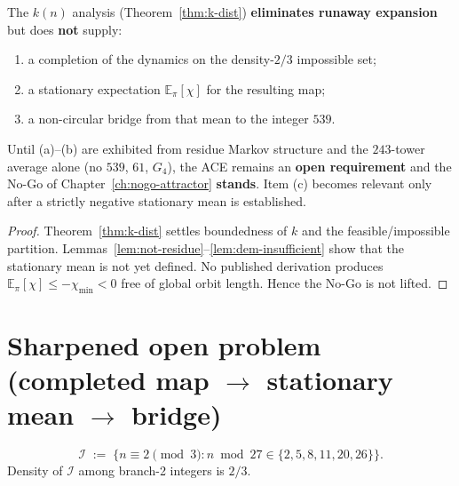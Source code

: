 \begin{theorem}
\label{thm:no-ACE-yet}
The \(k(n)\) analysis (Theorem~\ref{thm:k-dist}) \textbf{eliminates runaway
expansion} but does \textbf{not} supply:
\begin{enumerate}[label=(\alph*)]
  \item a completion of the dynamics on the density-\(2/3\) impossible set;
  \item a stationary expectation \(\mathbb{E}_\pi[\chi]\) for the resulting map;
  \item a non-circular bridge from that mean to the integer \(539\).
\end{enumerate}
Until (a)--(b) are exhibited from residue Markov structure and the
\(243\)-tower average alone (no \(539\), \(61\), \(G_4\)), the ACE remains an
\textbf{open requirement} and the No-Go of Chapter~\ref{ch:nogo-attractor}
\textbf{stands}. Item (c) becomes relevant only after a strictly negative
stationary mean is established.
\end{theorem}

\begin{proof}
Theorem~\ref{thm:k-dist} settles boundedness of \(k\) and the feasible/impossible
partition. Lemmas~\ref{lem:not-residue}--\ref{lem:dem-insufficient} show that
the stationary mean is not yet defined. No published derivation produces
\(\mathbb{E}_\pi[\chi]\le -\chi_{\min}<0\) free of global orbit length. Hence the
No-Go is not lifted.
\end{proof}

\section{Sharpened open problem (completed map \(\to\) stationary mean \(\to\) bridge)}
\label{sec:open}

\begin{definition}
\label{def:imp-set}
\[
\mathcal{I}
\;:=\;
\bigl\{
n\equiv 2\pmod{3}
:
n\bmod 27\in\{2,5,8,11,20,26\}
\bigr\}.
\]
Density of \(\mathcal{I}\) among branch-2 integers is \(2/3\).
\end{definition}

